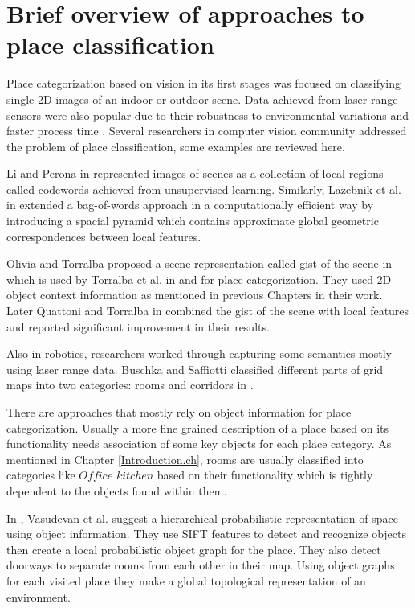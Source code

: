\section{Brief overview of approaches to place classification}
\label{OverviewPlaceClassification.sec}
 Place categorization based on vision in its first stages was focused on classifying single 2D images of an indoor or 
 outdoor scene.
 Data achieved from laser range sensors were also popular due to their robustness to environmental variations and faster process time
 .\cite{pronobis2011phd}
 Several researchers in computer vision community addressed the problem of place classification, some examples are 
 reviewed here.
 
 Li and Perona in \cite{Li:2005:BHM:1068508.1069129} represented images of scenes as a collection of local regions 
 called codewords achieved from unsupervised learning. 
 Similarly, Lazebnik et al. in \cite{1641019} extended a bag-of-words approach in a computationally efficient way
 by introducing a spacial pyramid which contains approximate global geometric correspondences between local features.
  
 Olivia and Torralba proposed a scene representation called gist of the scene in \cite{oliva2006building} which is 
 used by Torralba et al. in \cite{TorralbaContextualPriming} and \cite{TrollbaContexBased} for place categorization.
 They used 2D object context information as mentioned in previous Chapters in their work.
 Later Quattoni and Torralba in \cite{quattoni2009recognizing} combined the gist of the scene with local features and 
 reported significant improvement in their results.
 
 Also in robotics, researchers worked through capturing some semantics mostly using laser range data.
 Buschka and Saffiotti classified different parts of grid maps into two categories: rooms and corridors in \cite{buschka2002virtual}. 
 
 There are approaches that mostly rely on object information for place categorization.
 Usually a more fine grained description of a place based on its functionality needs association of some key objects 
 for each place category.
 As mentioned in Chapter \ref{Introduction.ch}, rooms are usually classified into categories like $Office$ $kitchen$ based on 
 their functionality which is tightly dependent to the objects found within them.
 
In \cite{Vasudevan2007359}, Vasudevan et al. suggest a hierarchical probabilistic representation of space using object
information. 
They use SIFT features to detect and recognize objects then create a local probabilistic object graph for the place. 
They also detect doorways to separate rooms from each other in their map. 
Using object graphs for each visited place they make a global topological representation of an environment.

